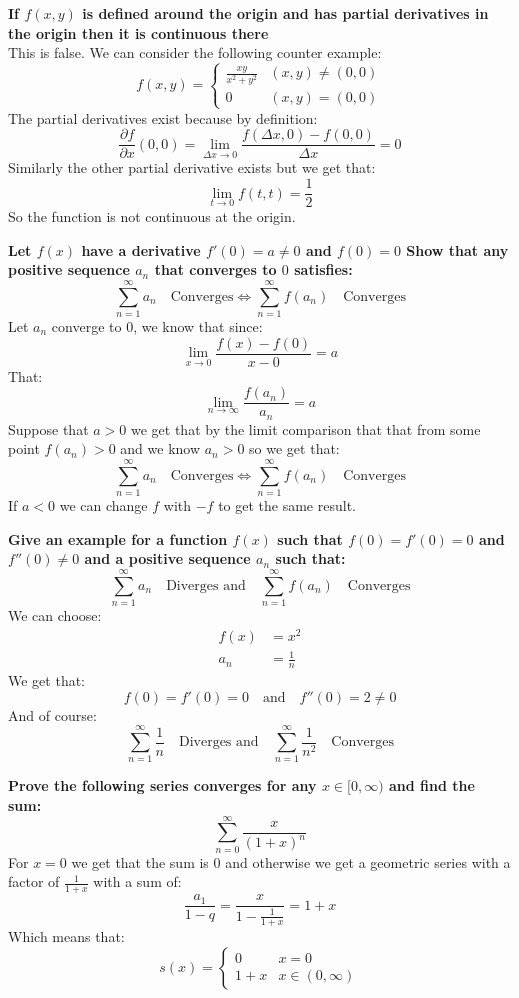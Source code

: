 \documentclass[11pt,a4paper]{article}
\begin{document}
	\newpage
	
	\textbf{If $f(x,y)$ is defined around the origin and has partial
	derivatives in the origin then it is continuous there} \\
	This is false. We can consider the following counter example:
	\[
		f(x,y) = \begin{cases}
			\frac{xy}{x^2+y^2} &(x,y) \neq (0,0) \\
			0 &(x,y) = (0,0)
		\end{cases}
	\]
	The partial derivatives exist because by definition:
	\[
		\frac{\partial f}{\partial x}(0,0) = 
		\lim_{\Delta x\to 0}
		\frac{f(\Delta x, 0) - f(0,0)}{\Delta x} = 
		0
	\]
	Similarly the other partial derivative exists but we get that:
	\[
		\lim_{t\to 0}{f(t,t)} = \frac{1}{2}
	\]
	So the function is not continuous at the origin.
	
	\newpage
	
	\textbf{Let $f(x)$ have a derivative $f'(0) = a \neq 0$ and $f(0) = 0$
	Show that any positive sequence $a_n$ that converges to $0$ satisfies:
	\[
		\sum_{n=1}^{\infty}{a_n} \quad \text{Converges} \iff
		\sum_{n=1}^{\infty}{f(a_n)} \quad \text{Converges}
	\]}
	Let $a_n$ converge to $0$, we know that since:
	\[
		\lim_{x\to 0}{\frac{f(x)-f(0)}{x-0}} = a
	\]
	That:
	\[
		\lim_{n\to \infty}{\frac{f(a_n)}{a_n}} = a
	\]
	Suppose that $a > 0$ we get that by the limit comparison that that
	from some point $f(a_n) > 0$ and we know $a_n > 0$ so we get
	that:
	\[
		\sum_{n=1}^{\infty}{a_n} \quad \text{Converges} \iff
		\sum_{n=1}^{\infty}{f(a_n)} \quad \text{Converges}
	\]
	If $a < 0$ we can change $f$ with $-f$ to get the same result.
	
	\newpage
	
	\textbf{Give an example for a function $f(x)$ such that $f(0)=f'(0)=0$
	and $f''(0) \neq 0$ and a positive sequence $a_n$ such that:
	\[
		\sum_{n=1}^{\infty}{a_n} \quad \text{Diverges and} \quad
		\sum_{n=1}^{\infty}{f(a_n)} \quad \text{Converges}
	\]}
	We can choose:
	\begin{align*}
		f(x) &= x^2 \\
		a_n  &= \frac{1}{n}
	\end{align*}
	We get that:
	\[
		f(0)=f'(0)=0
	\quad \text{and} \quad f''(0) = 2 \neq 0
	\]
	And of course:
	\[
		\sum_{n=1}^{\infty}{\frac{1}{n}} \quad \text{Diverges and} \quad
		\sum_{n=1}^{\infty}{\frac{1}{n^2}} \quad \text{Converges}
	\]
	
	\newpage
	
	\textbf{Prove the following series converges for any $x\in[0,\infty)$ and
	find the sum:
	\[
		\sum_{n=0}^{\infty}{\frac{x}{(1+x)^n}}
	\]}
	For $x = 0$ we get that the sum is $0$ and otherwise we get a geometric
	series with a factor of $\frac{1}{1+x}$ with a sum of:
	\[
		\frac{a_1}{1-q} = \frac{x}{1-\frac{1}{1+x}} = 1 + x
	\]
	Which means that:
	\[
		s(x) = \begin{cases}
			0 &x=0 \\
			1+x &x\in(0,\infty)
		\end{cases}
	\]
	
\end{document}
